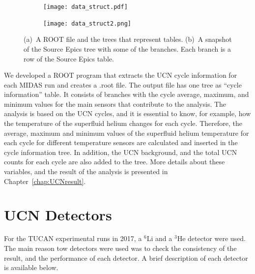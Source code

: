 \begin{figure}
\begin{subfigure}{.45\textwidth}
  \centering
  \texttt{[image: data\_struct.pdf]}
  \caption{}
  \label{fig:sfig1}
\end{subfigure}%
\begin{subfigure}{.45\textwidth}
  \centering
  \texttt{[image: data\_struct2.png]}
  \caption{}
  \label{fig:sfig2}
\end{subfigure}
\caption[TUCAN's data structure]{(a)~A ROOT file and the trees that
  represent tables. (b)~A snapshot of the Source Epics tree with some
  of the branches. Each branch is a row of the Source Epics table. }
\label{fig:data_struct}
\end{figure}

We developed a ROOT program that extracts the UCN cycle information
for each MIDAS run and creates a .root file.  The output file has one
tree as ``cycle information'' table. It consists of branches with the
cycle average, maximum, and minimum values for the main sensors that
contribute to the analysis.  The analysis is based on the UCN cycles,
and it is essential to know, for example, how the temperature of the
superfluid helium changes for each cycle. Therefore, the average,
maximum and minimum values of the superfluid helium temperature for
each cycle for different temperature sensors are calculated and
inserted in the cycle information tree. In addition, the UCN
background, and the total UCN counts for each cycle are also added to
the tree. More details about these variables, and the result of the
analysis is presented in Chapter~\ref{chap:UCNresult}.






\section{UCN Detectors\label{sec:detectors}}
For the TUCAN experimental runs in 2017, a $^6$Li and a $^3$He
detector were used. The main reason tow detectors were used was to
check the consistency of the result, and the performance of each
detector. A brief description of each detector is available below.

